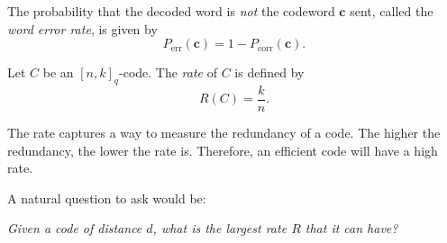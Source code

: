 The probability that the decoded word is \textit{not} the codeword $\textbf{c}$ sent, called the \textit{word error rate}, is given by
$$P_\text{err}(\textbf{c})=1-P_\text{corr}(\textbf{c}).$$

\begin{definition}
    Let $C$ be an $[n,k]_q$-code. The \textit{rate} of $C$ is defined by $$R(C)=\frac{k}{n}.$$
\end{definition}

The rate captures a way to measure the redundancy of a code. The higher the redundancy, the lower the rate is. Therefore, an efficient code will have a high rate.

\vspace{2mm}
A natural question to ask would be:

\textit{Given a code of distance $d$, what is the largest rate $R$ that it can have?}



    

